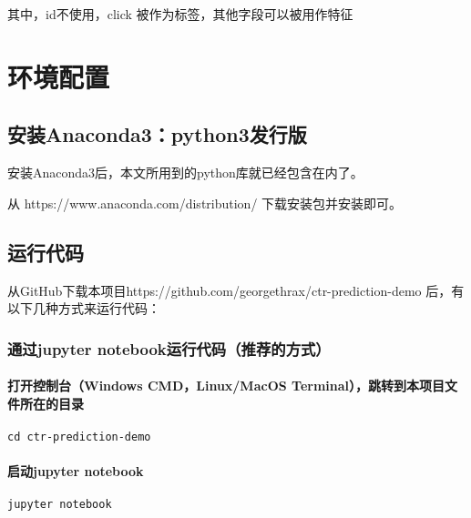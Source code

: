 \documentclass[11pt]{article}
\begin{document}
其中，id不使用，click 被作为标签，其他字段可以被用作特征

    \section{环境配置}\label{ux73afux5883ux914dux7f6e}

    \subsection{安装Anaconda3：python3发行版}\label{ux5b89ux88c5anaconda3python3ux53d1ux884cux7248}

安装Anaconda3后，本文所用到的python库就已经包含在内了。

从 https://www.anaconda.com/distribution/ 下载安装包并安装即可。

    \subsection{运行代码}\label{ux8fd0ux884cux4ee3ux7801}

从GitHub下载本项目https://github.com/georgethrax/ctr-prediction-demo
后，有以下几种方式来运行代码：

    \subsubsection{通过jupyter
notebook运行代码（推荐的方式）}\label{ux901aux8fc7jupyter-notebookux8fd0ux884cux4ee3ux7801ux63a8ux8350ux7684ux65b9ux5f0f}

\paragraph{打开控制台（Windows CMD，Linux/MacOS
Terminal），跳转到本项目文件所在的目录}\label{ux6253ux5f00ux63a7ux5236ux53f0windows-cmdlinuxmacos-terminalux8df3ux8f6cux5230ux672cux9879ux76eeux6587ux4ef6ux6240ux5728ux7684ux76eeux5f55}

\begin{verbatim}
cd ctr-prediction-demo
\end{verbatim}

\paragraph{启动jupyter notebook}\label{ux542fux52a8jupyter-notebook}

\begin{verbatim}
jupyter notebook
\end{verbatim}
\end{document}
